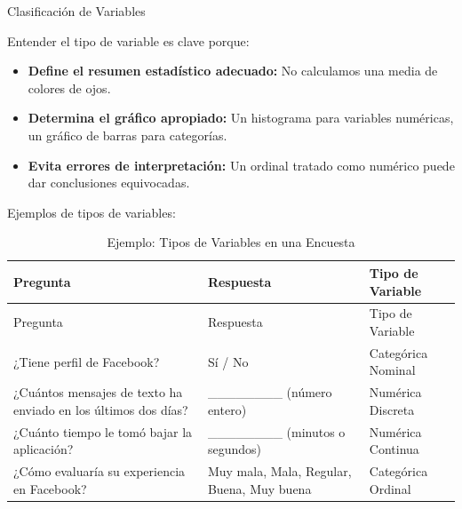 \documentclass[
  spanish,
  letterpaper,
  DIV=11,
  numbers=noendperiod]{scrreprt}
\providecommand{\tightlist}{%
  \setlength{\itemsep}{0pt}\setlength{\parskip}{0pt}}
\begin{document}
Clasificación de Variables

Entender el tipo de variable es clave porque:

\begin{itemize}
\tightlist
\item
  \textbf{Define el resumen estadístico adecuado:} No calculamos una
  media de colores de ojos.\\
\item
  \textbf{Determina el gráfico apropiado:} Un histograma para variables
  numéricas, un gráfico de barras para categorías.\\
\item
  \textbf{Evita errores de interpretación:} Un ordinal tratado como
  numérico puede dar conclusiones equivocadas.
\end{itemize}

Ejemplos de tipos de variables:

\begin{longtable}[]{@{}
  >{\raggedright\arraybackslash}p{}
  >{\raggedright\arraybackslash}p{}
  >{\raggedright\arraybackslash}p{}@{}}
\caption{Ejemplo: Tipos de Variables en una
Encuesta}\label{tbl-ejemplos}\tabularnewline
\toprule\noalign{}
\begin{minipage}[b]{\linewidth}\raggedright
Pregunta
\end{minipage} & \begin{minipage}[b]{\linewidth}\raggedright
Respuesta
\end{minipage} & \begin{minipage}[b]{\linewidth}\raggedright
Tipo de Variable
\end{minipage} \\
\midrule\noalign{}
\endfirsthead
\toprule\noalign{}
\begin{minipage}[b]{\linewidth}\raggedright
Pregunta
\end{minipage} & \begin{minipage}[b]{\linewidth}\raggedright
Respuesta
\end{minipage} & \begin{minipage}[b]{\linewidth}\raggedright
Tipo de Variable
\end{minipage} \\
\midrule\noalign{}
\endhead
\bottomrule\noalign{}
\endlastfoot
¿Tiene perfil de Facebook? & Sí / No & Categórica Nominal \\
¿Cuántos mensajes de texto ha enviado en los últimos dos días? &
\_\_\_\_\_\_\_\_ (número entero) & Numérica Discreta \\
¿Cuánto tiempo le tomó bajar la aplicación? & \_\_\_\_\_\_\_\_ (minutos
o segundos) & Numérica Continua \\
¿Cómo evaluaría su experiencia en Facebook? & Muy mala, Mala, Regular,
Buena, Muy buena & Categórica Ordinal \\
\end{longtable}
\end{document}
